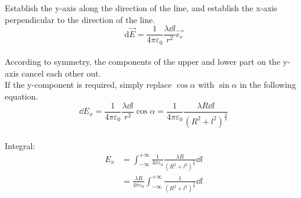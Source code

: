 \documentclass[cn,hazy,blue,14pt,normal]{elegantnote}
\numberwithin{equation}{section}
\begin{document}
\begin{figure}
\end{figure}
\noindent
Establish the y-axis along the direction of the line, and establish the x-axis perpendicular to the direction of the line.
\\
$$
\text{d}\vec{E}=\frac{1}{4\pi\varepsilon_0}\frac{\lambda\dd l}{r^2}\vec{e_r}
$$
\\
According to symmetry, the components of the upper and lower part on the y-axis cancel each other out. \\
If the y-component is required, simply replace $\cos\alpha$ with $\sin\alpha$ in the following equation.
\\
$$
\dd E_x=\frac{1}{4\pi\varepsilon_0}\frac{\lambda\dd l}{r^2}\cos \alpha
=\frac{1}{4\pi\varepsilon_0}\frac{\lambda R\dd l}{(R^2+l^2)^{\frac{3}{2}}}
$$
\\
Integral:
\begin{align*}
	E_x&=\int^{+\infty}_{-\infty}\frac{1}{4\pi\varepsilon_0}\frac{\lambda R}{(R^2+l^2)^{\frac{3}{2}}}\dd l\\
	&=\frac{\lambda R}{4\pi\varepsilon_0}\int^{+\infty}_{-\infty}\frac{1}{(R^2+l^2)^{\frac{3}{2}}}\dd l
\end{align*}
\end{document}
